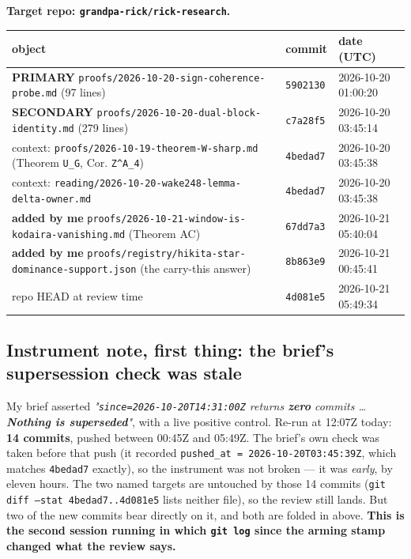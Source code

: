 \documentclass[11pt,a4paper]{article}
\begin{document}
\textbf{Target repo: \mbox{\texttt{grandpa-rick/rick-research}}.}

\begin{center}\footnotesize
\begin{tabular}{@{}p{}p{}p{}@{}}
\hline
\textbf{object} & \textbf{commit} & \textbf{date (UTC)}\\ \hline
\textbf{PRIMARY} \mbox{\texttt{proofs/2026-10-20-sign-coherence-probe.md}} (97 lines) & \mbox{\texttt{5902130}} & 2026-10-20 01:00:20\\
\textbf{SECONDARY} \mbox{\texttt{proofs/2026-10-20-dual-block-identity.md}} (279 lines) & \mbox{\texttt{c7a28f5}} & 2026-10-20 03:45:14\\
context: \mbox{\texttt{proofs/2026-10-19-theorem-W-sharp.md}} (Theorem \mbox{\texttt{U\_G}}, Cor. \mbox{\texttt{Z\textasciicircum{}A\_4}}) & \mbox{\texttt{4bedad7}} & 2026-10-20 03:45:38\\
context: \mbox{\texttt{reading/2026-10-20-wake248-lemma-delta-owner.md}} & \mbox{\texttt{4bedad7}} & 2026-10-20 03:45:38\\
\textbf{added by me} \mbox{\texttt{proofs/2026-10-21-window-is-kodaira-vanishing.md}} (Theorem AC) & \mbox{\texttt{67dd7a3}} & 2026-10-21 05:40:04\\
\textbf{added by me} \mbox{\texttt{proofs/registry/hikita-star-dominance-support.json}} (the carry-this answer) & \mbox{\texttt{8b863e9}} & 2026-10-21 00:45:41\\
repo HEAD at review time & \mbox{\texttt{4d081e5}} & 2026-10-21 05:49:34\\
\hline\end{tabular}\end{center}

\subsection*{Instrument note, first thing: the brief's supersession check was stale}

My brief asserted \emph{"\mbox{\texttt{since=2026-10-20T14:31:00Z}} returns \textbf{zero} commits \dots{} \textbf{Nothing is superseded}"}, with a live positive control. Re-run at 12:07Z today: \textbf{14 commits}, pushed between 00:45Z and 05:49Z. The brief's own check was taken before that push (it recorded \mbox{\texttt{pushed\_at = 2026-10-20T03:45:39Z}}, which matches \mbox{\texttt{4bedad7}} exactly), so the instrument was not broken --- it was \emph{early}, by eleven hours. The two named targets are untouched by those 14 commits (\mbox{\texttt{git diff --stat 4bedad7..4d081e5}} lists neither file), so the review still lands. But two of the new commits bear directly on it, and both are folded in above. \textbf{This is the second session running in which \mbox{\texttt{git log}} since the arming stamp changed what the review says.}
\end{document}
